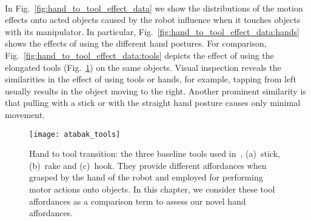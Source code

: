 \begin{figure*}
     \\
    \caption[Motion caused by different robotic manipulators~(hands and tools) when using different actions and manipulator morphologies.]{Motion caused by different robotic manipulators~(hands and tools) when using different actions and manipulator morphologies: in Fig.~\ref{fig:hand_to_tool_effect_data:hands} we use different hand postures, whereas in Fig.~\ref{fig:hand_to_tool_effect_data:tools} we vary tool types for comparison. Each plot displays the geometrical displacement along horizontal and vertical direction~(in meters, measured from the object initial position) from the point of view of the robot~(the robot is at the~0 in the x-axis marker). For example, tapping an object from the right~(tapFromRight action) usually results in making the object shift to the left direction; pulling an object closer only works if the manipulator morphology is appropriate.}
    \label{fig:hand_to_tool_effect_data}
\end{figure*}

In Fig.~\ref{fig:hand_to_tool_effect_data} we show the distributions of the motion effects onto acted objects caused by the robot influence when it touches objects with its manipulator.
In particular, Fig.~\ref{fig:hand_to_tool_effect_data:hands} shows the effects of using the different hand postures.
For comparison, Fig.~\ref{fig:hand_to_tool_effect_data:tools} depicts the effect of using the elongated tools (Fig.~\ref{fig:dehban_tools}) on the same objects.
Visual inspection reveals the similarities in the effect of using tools or hands, for example, tapping from left usually results in the object moving to the right.
Another prominent similarity is that pulling with a stick or with the straight hand posture causes only minimal movement.

\begin{figure}
    \centering
    \texttt{[image: atabak\_tools]}
    \caption[Hand to tool transition: the three baseline tools used in~\cite{dehban:2016:eccvws}.]{Hand to tool transition: the three baseline tools used in~\cite{dehban:2016:eccvws},
    (a)~stick, (b)~rake and (c)~hook. They provide different affordances when grasped by the hand of the robot and employed for performing motor actions onto objects. In this chapter, we consider these tool affordances as a comparison term to assess our novel hand affordances.}
    \label{fig:dehban_tools}
\end{figure}

